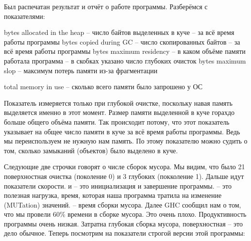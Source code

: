 
Был распечатан результат и отчёт о работе программы. Разберёмся
с показателями:

\begin{code}
bytes allocated in the heap  -- число байтов выделенных в куче
                             -- за всё время работы программы
bytes copied during GC       -- число скопированных байтов
                             -- за всё время работы программы
bytes maximum residency      -- в каком объёме памяти работала программа 
                             -- в скобках указано число глубоких очисток
bytes maximum slop           -- максимум потерь памяти из-за фрагментации

total memory in use          -- сколько всего памяти было запрошено у ОС
\end{code}

Показатель  измеряется только
при глубокой очистке, поскольку навая память выделяется именно
в этот момент. Размер памяти выделенной в куче горахдо больше
общего объёма памяти. Так происходит потому, что этот показатель
указывает на общее число памяти в куче за всё время работы программы.
Ведь мы переиспользуем не нужную нам память. По этому
показателю можно судить о том, сколько замыканий (объектов) 
было выделено в куче. 

Следующие две строчки говорят о числе сборок мусора. Мы видим,
что было 21 поверхностная очистка (поколение 0) и 3 глубоких (покколение 1). 
Дальше идут показатели скорости.  и  -- это 
инициализация и завершение программы.  -- это полезная
нагрузка, время, которая наша программа тратила на изменение (MUTation)
значений.  -- время сборки мусора. Далее GHC сообщил
нам о том, что мы провели 60\% времени в сборке мусора.
Это очень плохо. Продуктивность программы очень низкая. 
Затратна глубокая сборка мусора, поверхностная -- это дело обычное.
Теперь посмотрим на показатели строгой версии этой программы:

